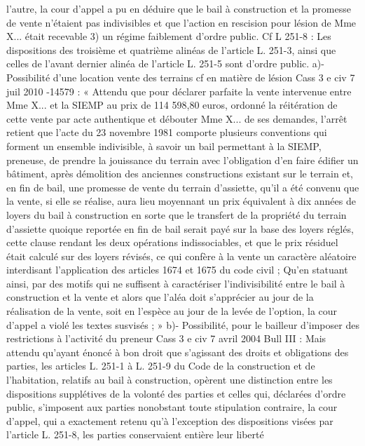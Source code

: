 \documentclass[11pt,a4paper]{report}
\begin{document}
	l'autre, la cour d'appel a pu en déduire que le bail à construction et la promesse de vente n'étaient pas
	indivisibles et que l'action en rescision pour lésion de Mme X... était recevable
	3) un régime faiblement d’ordre public. Cf L 251-8 : Les dispositions des troisième et quatrième alinéas de
	l'article L. 251-3, ainsi que celles de l'avant dernier alinéa de l'article L. 251-5 sont d'ordre public.
	a)-Possibilité d’une location vente des terrains
	cf en matière de lésion Cass 3 e civ 7 juil 2010 -14579 : « Attendu que pour déclarer parfaite la vente
	intervenue entre Mme X... et la SIEMP au prix de 114 598,80 euros, ordonné la réitération de cette vente par
	acte authentique et débouter Mme X... de ses demandes, l'arrêt retient que l'acte du 23 novembre 1981 comporte
	plusieurs conventions qui forment un ensemble indivisible, à savoir un bail permettant à la SIEMP, preneuse, de
	prendre la jouissance du terrain avec l'obligation d'en faire édifier un bâtiment, après démolition des anciennes
	constructions existant sur le terrain et, en fin de bail, une promesse de vente du terrain d'assiette, qu'il a été
	convenu que la vente, si elle se réalise, aura lieu moyennant un prix équivalent à dix années de loyers du bail à
	construction en sorte que le transfert de la propriété du terrain d'assiette quoique reportée en fin de bail serait
	payé sur la base des loyers réglés, cette clause rendant les deux opérations indissociables, et que le prix résiduel
	était calculé sur des loyers révisés, ce qui confère à la vente un caractère aléatoire interdisant l'application des
	articles 1674 et 1675 du code civil ;
	Qu'en statuant ainsi, par des motifs qui ne suffisent à caractériser l'indivisibilité entre le bail à construction et la
	vente et alors que l'aléa doit s'apprécier au jour de la réalisation de la vente, soit en l'espèce au jour de la levée
	de l'option, la cour d'appel a violé les textes susvisés ; »
	b)- Possibilité, pour le bailleur d’imposer des restrictions à l’activité du preneur Cass 3 e civ 7 avril 2004
	Bull III  : Mais attendu qu'ayant énoncé à bon droit que s'agissant des droits et obligations des parties, les
	articles L. 251-1 à L. 251-9 du Code de la construction et de l'habitation, relatifs au bail à construction, opèrent
	une distinction entre les dispositions supplétives de la volonté des parties et celles qui, déclarées d'ordre public,
	s'imposent aux parties nonobstant toute stipulation contraire, la cour d'appel, qui a exactement retenu qu'à
	l'exception des dispositions visées par l'article L. 251-8, les parties conservaient entière leur liberté
\end{document}
